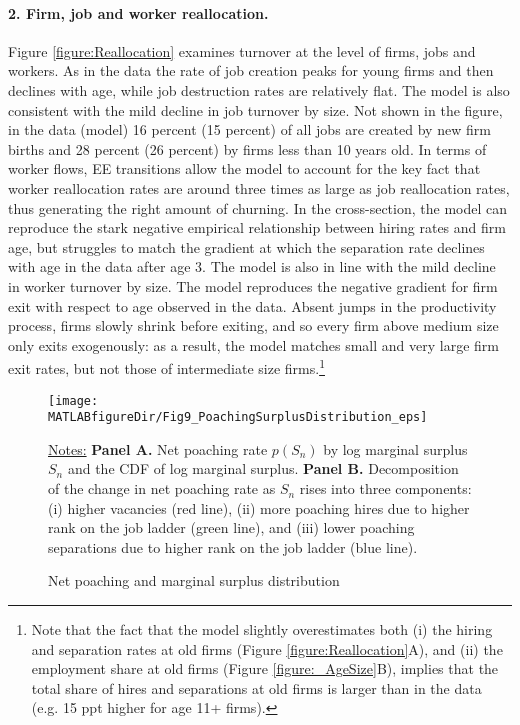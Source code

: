 \paragraph{2. Firm, job and worker reallocation.}
Figure \ref{figure:Reallocation} examines turnover at the level of firms, jobs and workers.
As in the data the rate of job creation peaks for young firms and then declines with age, while job destruction rates are relatively flat.
The model is also consistent with the mild decline in job turnover by size.
Not shown in the figure, in the data (model) 16 percent (15 percent) of all jobs are created by new firm births and 28 percent (26 percent) by firms less than 10 years old.
In terms of worker flows,  EE transitions allow the model to account for the key fact that worker reallocation rates are around three times as large as job reallocation rates, thus generating the right amount of churning.
In the cross-section, the model can reproduce the stark negative empirical relationship between hiring rates and firm age, but struggles to match the gradient at which the separation rate declines with age in the data after age 3.
The model is also in line with the mild decline in worker turnover by size.
The model reproduces the negative gradient for firm exit with respect to age observed in the data.
Absent jumps in the productivity process, firms slowly shrink before exiting, and so every firm  above medium size only exits exogenously: as a result, the model matches small and very large firm exit rates, but not those of intermediate size firms.\footnote{
    Note that the fact that the model slightly overestimates both (i) the hiring and separation rates at old firms (Figure \ref{figure:Reallocation}A), and (ii) the employment share at old firms (Figure \ref{figure:_AgeSize}B), implies that the total share of hires and separations at old firms is larger than in the data (e.g. 15 ppt higher for age 11+ firms).
}

\begin{figure}[t]
\begin{center}
\hspace*{-0.5cm}\texttt{[image: \\MATLABfigureDir/Fig9\_PoachingSurplusDistribution\_eps]}
\caption{Net poaching and marginal surplus distribution}\label{figure:PoachingSnDecomposition}\vspace*{-0.3cm}
\end{center}
{\footnotesize \underline{Notes:}
\textbf{Panel A.} Net poaching rate $p(S_n)$ by log marginal surplus $S_n$ and the CDF of log marginal surplus.
\textbf{Panel B.} Decomposition of the change in net poaching rate as $S_n$ rises into three components: (i) higher vacancies (red line), (ii) more poaching hires due to higher rank on the job ladder (green line), and (iii) lower poaching separations due to higher rank on the job ladder (blue line).
}
\end{figure}

